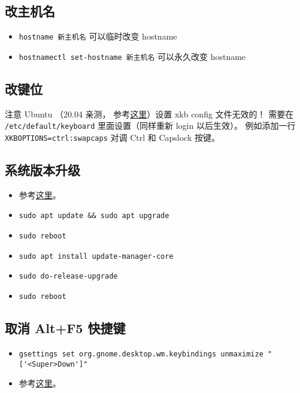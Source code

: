 
\subsection{改主机名}
\begin{itemize}
\item \verb|hostname 新主机名| 可以临时改变 hostname
\item \verb|hostnamectl set-hostname 新主机名| 可以永久改变 hostname
\end{itemize}


\subsection{改键位}
注意 Ubuntu （20.04 亲测， 参考\href{https://manpages.ubuntu.com/manpages/focal/en/man5/keyboard.5.html}{这里}）设置 xkb config 文件无效的！ 需要在 \verb|/etc/default/keyboard| 里面设置（同样重新 login 以后生效）。 例如添加一行 \verb|XKBOPTIONS=ctrl:swapcaps| 对调 Ctrl 和 Capslock 按键。

\subsection{系统版本升级}
\begin{itemize}
\item 参考\href{https://www.cyberciti.biz/faq/upgrade-ubuntu-18-04-to-20-04-lts-using-command-line/#Make_a_backup}{这里}。
\item \verb|sudo apt update && sudo apt upgrade|
\item \verb|sudo reboot|
\item \verb|sudo apt install update-manager-core|
\item \verb|sudo do-release-upgrade|
\item \verb|sudo reboot|
\end{itemize}

\subsection{取消 Alt+F5 快捷键}
\begin{itemize}
\item \verb|gsettings set org.gnome.desktop.wm.keybindings unmaximize "['<Super>Down']"|
\item 参考\href{https://askubuntu.com/questions/1322105/cant-find-alt-f5-in-settings-keyboard-shortcuts}{这里}。
\end{itemize}

